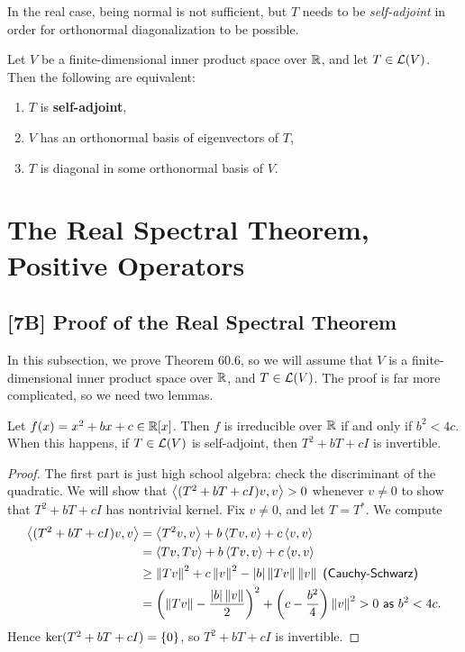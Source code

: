 \documentclass{article}
\begin{document}
In the real case, being normal is not sufficient, but $T$ needs to be \textit{self-adjoint} in order for orthonormal diagonalization to be possible.
\begin{theorem}
Let $V$ be a finite-dimensional inner product space over $\mathbb R$, and let $T\in \mathcal L(V)$. Then the following are equivalent:
\begin{enumerate}
    \item $T$ is \textbf{self-adjoint},
    \item $V$ has an orthonormal basis of eigenvectors of $T$,
    \item $T$ is diagonal in some orthonormal basis of $V$.
\end{enumerate}
\end{theorem}
\section{The Real Spectral Theorem, Positive Operators}
\subsection*{[7B] Proof of the Real Spectral Theorem}
In this subsection, we prove Theorem 60.6, so we will assume that $V$ is a finite-dimensional inner product space over $\mathbb R$, and $T\in\mathcal L(V)$. The proof is far more complicated, so we need two lemmas.
\begin{lemma}
Let $f(x) = x^2+bx+c\in\mathbb R[x]$. Then $f$ is irreducible over $\mathbb R$ if and only if $b^2 < 4c$. When this happens, if $T\in \mathcal L(V)$ is self-adjoint, then $T^2+bT+cI$ is invertible.
\end{lemma}
\begin{proof}
The first part is just high school algebra: check the discriminant of the quadratic. We will show that $\left\langle(T^2 + bT + cI)v, v\right\rangle > 0$ whenever $v\neq 0$ to show that $T^2+bT+cI$ has nontrivial kernel. Fix $v\neq 0$, and let $T = T^*$. We compute
\begin{align*}
\left\langle(T^2+bT+cI)v, v\right\rangle &= \left\langle T^2v, v\right\rangle + b\left\langle Tv, v\right\rangle + c\left\langle v,v\right\rangle \\
&= \left\langle Tv, Tv\right\rangle + b\left\langle Tv, v\right\rangle + c\left\langle v,v\right\rangle \\
&\geq \left\Vert Tv\right\Vert^2 + c\left\Vert v\right\Vert^2 - \left|b\right|\left\Vert Tv\right\Vert \left\Vert v\right\Vert \textsf{ (Cauchy-Schwarz)} \\
&= \left(\left\Vert Tv\right\Vert - \frac{|b|\left\Vert v\right\Vert}2 \right)^2 + \left( c - \frac{b^2}4 \right)\left\Vert v\right\Vert^2 > 0 \textsf{ as } b^2<4c.
\end{align*}
Hence $\ker(T^2+bT+cI) = \left\{0\right\}$, so $T^2+bT+cI$ is invertible.
\end{proof}
\end{document}
